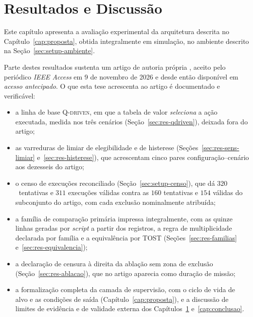 \chapter{Resultados e Discussão}
\label{cap:resultados}

Este capítulo apresenta a avaliação experimental da arquitetura descrita no
Capítulo~\ref{cap:proposta}, obtida integralmente em simulação, no ambiente descrito
na Seção~\ref{sec:setup-ambiente}.

Parte destes resultados sustenta um artigo de autoria própria
\cite{MirandaNeto2026TwoLayer}, aceito pelo periódico \textit{IEEE Access} em 9 de
novembro de 2026 e desde então disponível em \emph{acesso antecipado}. O que esta tese acrescenta ao artigo é
documentado e verificável:

\begin{itemize}
    \item a linha de base \textsc{Q-driven}, em que a tabela de valor \emph{seleciona}
    a ação executada, medida nos três cenários (Seção~\ref{sec:res-qdriven}), deixada
    fora do artigo;
    \item as varreduras de limiar de elegibilidade e de histerese
    (Seções~\ref{sec:res-sens-limiar} e~\ref{sec:res-histerese}), que acrescentam cinco
    pares configuração--cenário aos dezesseis do artigo;
    \item o censo de execuções reconciliado (Seção~\ref{sec:setup-censo}), que dá
    $320$~tentativas e $311$ execuções válidas contra as $160$ tentativas e $154$
    válidas do subconjunto do artigo, com cada exclusão nominalmente atribuída;
    \item a família de comparação primária impressa integralmente, com as quinze linhas
    geradas por \textit{script} a partir dos registros, a regra de multiplicidade
    declarada por família e a equivalência por \ac{TOST}
    (Seções~\ref{sec:res-familias} e~\ref{sec:res-equivalencia});
    \item a declaração de censura à direita da ablação sem zona de exclusão
    (Seção~\ref{sec:res-ablacao}), que no artigo aparecia como duração de missão;
    \item a formalização completa da camada de supervisão, com o ciclo de vida de alvo
    e as condições de saída (Capítulo~\ref{cap:proposta}), e a discussão de limites de
    evidência e de validade externa dos Capítulos~\ref{cap:resultados}
    e~\ref{cap:conclusao}.
\end{itemize}

